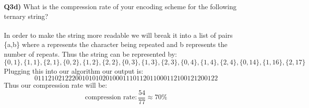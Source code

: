 \documentclass[12pt]{article}
\begin{document}
\newpage
\begin{adjustwidth}{0em}{0pt}
\textbf{Q3d)} What is the compression rate of your encoding scheme for the following ternary string? \\\\
In order to make the string more readable we will break it into a list of pairs \{a,b\} where a represents the character being repeated and b represents the number of repeats. Thus the string can be represented by:
\[ \{0,1\}, \{1, 1\}, \{2,1\}, \{0,2\}, \{1,2\}, \{2,2\}, \{0, 3\}, \{1, 3\}, \{2, 3\}, \{0, 4\}, \{1,4\}, \{2,4\}, \{0, 14\}, \{1, 16\}, \{2,17\} \]
Plugging this into our algorithm our output is:
\[ 011121021222001010102010001110112011000112100121200122 \]
Thus our compression rate will be:
\[ \text{compression rate} : \frac{54}{77} \approx 70\% \]
\end{adjustwidth} 
\end{document}
